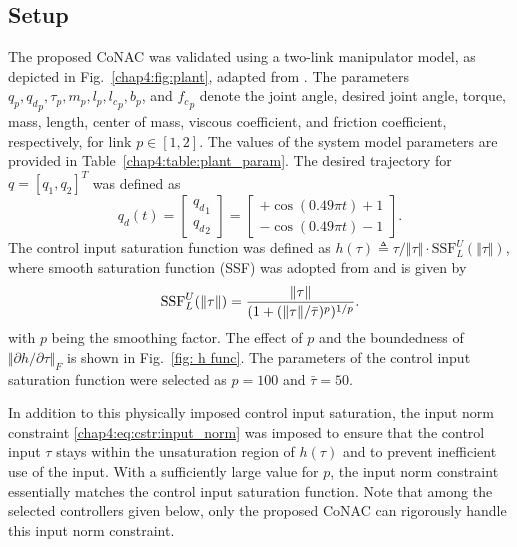 \subsection{Setup}

The proposed CoNAC was validated using a two-link manipulator model, as depicted in Fig.~\ref{chap4:fig:plant}, adapted from \cite{RN33}. 
The parameters $q_p,{q_d}_p,\tau_p,m_p,l_p,{l_c}_p,b_p$, and ${f_c}_p$ denote the joint angle, desired joint angle, torque, mass, length, center of mass, viscous coefficient, and friction coefficient, respectively, for link $p\in[1,2]$.
The values of the system model parameters are provided in Table~\ref{chap4:table:plant_param}. The desired trajectory for ${q}=[q_1,q_2]^T$ was defined as
\begin{equation}
    {q_d}(t) = 
    \begin{bmatrix}
        {q_d}_1\\{q_d}_2
    \end{bmatrix}
    =
    \begin{bmatrix}
        +\cos(0.49\pi t) + 1 \\
        -\cos(0.49\pi t) - 1 
    \end{bmatrix}.
\end{equation}
The control input saturation function was defined as $h(\tau)\triangleq \tau/\Vert\tau\Vert \cdot \text{SSF}_L^U(\Vert\tau\Vert)$, where smooth saturation function (SSF) was adopted from \cite{RN72} and is given by
\begin{equation}
    \text{SSF}_L^U(\Vert\tau\Vert) = {\Vert\tau\Vert\over (1+(\Vert\tau\Vert/\bar\tau)^p)^{1/p}}.
    \label{chap4:eq:sat_h}
\end{equation}
with $p$ being the smoothing factor. 
The effect of $p$ and the boundedness of $\Vert\partial h/\partial \tau\Vert_F$ is shown in Fig.~\ref{fig: h func}.
The parameters of the control input saturation function were selected as $p=100$ and $\bar\tau=50$. 

In addition to this physically imposed control input saturation, the input norm constraint \eqref{chap4:eq:cstr:input_norm} was imposed to ensure that the control input $\tau$ stays within the unsaturation region of $h(\tau)$ and to prevent inefficient use of the input. 
With a sufficiently large value for $p$, the input norm constraint essentially matches the control input saturation function. 
Note that among the selected controllers given below, only the proposed CoNAC can rigorously handle this input norm constraint.

